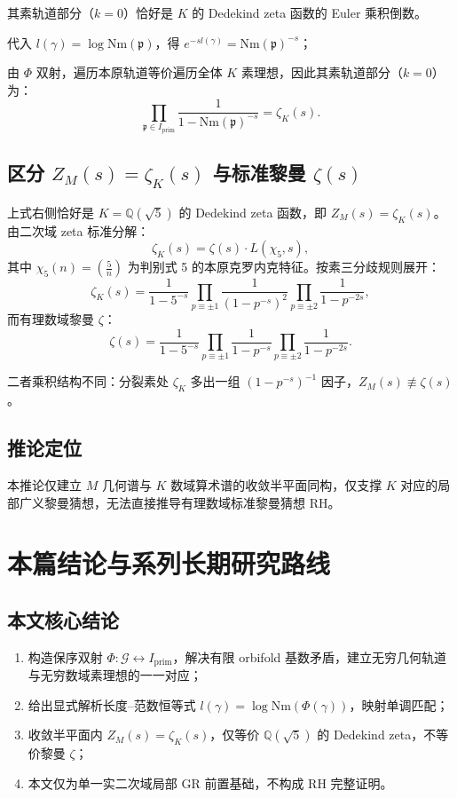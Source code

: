 \documentclass[12pt,a4paper]{article}
\begin{document}
其素轨道部分（$k = 0$）恰好是 $K$ 的 Dedekind zeta 函数的 Euler 乘积倒数。

代入 $l(\gamma) = \log \mathrm{Nm}(\mathfrak{p})$，得 $e^{-sl(\gamma)} = \mathrm{Nm}(\mathfrak{p})^{-s}$；

由 $\Phi$ 双射，遍历本原轨道等价遍历全体 $K$ 素理想，因此其素轨道部分（$k = 0$）为：
\[
\prod_{\mathfrak{p} \in I_{\mathrm{prim}}} \frac{1}{1 - \mathrm{Nm}(\mathfrak{p})^{-s}} = \zeta_K(s).
\]

\subsection{区分 $Z_M(s) = \zeta_K(s)$ 与标准黎曼 $\zeta(s)$}

上式右侧恰好是 $K = \mathbb{Q}(\sqrt{5})$ 的 Dedekind zeta 函数，即 $Z_M(s) = \zeta_K(s)$。由二次域 zeta 标准分解：
\[
\zeta_K(s) = \zeta(s) \cdot L(\chi_5, s),
\]
其中 $\chi_5(n) = \left(\frac{5}{n}\right)$ 为判别式 5 的本原克罗内克特征。按素三分歧规则展开：
\[
\zeta_K(s) = \frac{1}{1 - 5^{-s}} \prod_{p \equiv \pm 1} \frac{1}{(1 - p^{-s})^2} \prod_{p \equiv \pm 2} \frac{1}{1 - p^{-2s}},
\]
而有理数域黎曼 $\zeta$：
\[
\zeta(s) = \frac{1}{1 - 5^{-s}} \prod_{p \equiv \pm 1} \frac{1}{1 - p^{-s}} \prod_{p \equiv \pm 2} \frac{1}{1 - p^{-2s}}.
\]

二者乘积结构不同：分裂素处 $\zeta_K$ 多出一组 $(1 - p^{-s})^{-1}$ 因子，$Z_M(s) \not\equiv \zeta(s)$。

\subsection{推论定位}

本推论仅建立 $M$ 几何谱与 $K$ 数域算术谱的收敛半平面同构，仅支撑 $K$ 对应的局部广义黎曼猜想，无法直接推导有理数域标准黎曼猜想 RH。

\section{本篇结论与系列长期研究路线}

\subsection{本文核心结论}

\begin{enumerate}[label=\arabic*.]
\item 构造保序双射 $\Phi: \mathcal{G} \leftrightarrow I_{\mathrm{prim}}$，解决有限 orbifold 基数矛盾，建立无穷几何轨道与无穷数域素理想的一一对应；
\item 给出显式解析长度--范数恒等式 $l(\gamma) = \log \mathrm{Nm}(\Phi(\gamma))$，映射单调匹配；
\item 收敛半平面内 $Z_M(s) = \zeta_K(s)$，仅等价 $\mathbb{Q}(\sqrt{5})$ 的 Dedekind zeta，不等价黎曼 $\zeta$；
\item 本文仅为单一实二次域局部 GR 前置基础，不构成 RH 完整证明。
\end{enumerate}
\end{document}

